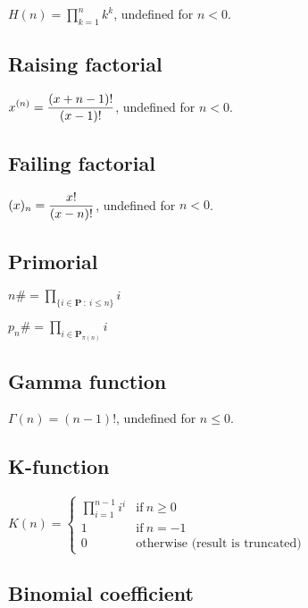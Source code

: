 \( \displaystyle{
    H(n) = \prod_{k = 1}^n k^k
}\), undefined for $n < 0$.


\subsection{Raising factorial}
\label{sec:Raising factorial}

\( \displaystyle{
    x^{(n)} = {(x + n - 1)! \over (x - 1)!}
}\), undefined for $n < 0$.


\subsection{Failing factorial}
\label{sec:Failing factorial}

\( \displaystyle{
    (x)_n = {x! \over (x - n)!}
}\), undefined for $n < 0$.


\subsection{Primorial}
\label{sec:Primorial}

\( \displaystyle{
    n\# = \prod_{\lbrace i \in \textbf{P} ~:~ i \le n \rbrace} i
}\)
\vspace{1em}

\noindent
\( \displaystyle{
    p_n\# = \prod_{i \in \textbf{P}_{\pi(n)}} i
}\)


\subsection{Gamma function}
\label{sec:Gamma function}

$\Gamma(n) = (n - 1)!$, undefined for $n \le 0$.


\subsection{K-function}
\label{sec:K-function}

\( \displaystyle{
    K(n) = \left \lbrace \begin{array}{ll}
      \displaystyle{\prod_{i = 1}^{n - 1} i^i}  & \textrm{if}~ n \ge 0 \\
      1 & \textrm{if}~ n = -1 \\
      0 & \textrm{otherwise (result is truncated)}
    \end{array} \right .
}\)


\subsection{Binomial coefficient}
\label{sec:Binomial coefficient}

